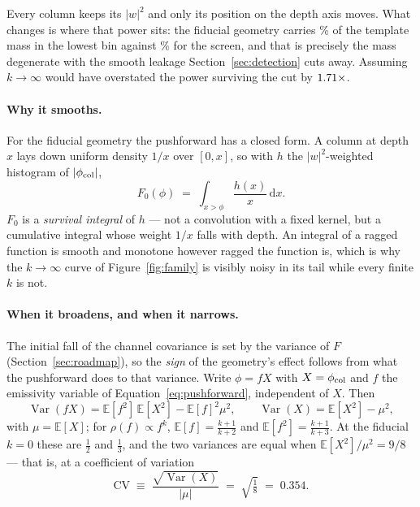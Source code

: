 \documentclass[11pt]{article}
\begin{document}
Every column keeps its $|w|^2$ and only its position on the depth axis
moves. What changes is where that power sits: the fiducial geometry
carries \MassZeroBinFid\% of the template mass in the lowest bin
against \MassZeroBinInf\% for the screen, and that is precisely the
mass degenerate with the smooth leakage Section~\ref{sec:detection}
cuts away. Assuming $k\to\infty$ would have overstated the power
surviving the cut by $1.71\times$.

\paragraph{Why it smooths.} For the fiducial geometry the pushforward
has a closed form. A column at depth $x$ lays down uniform density
$1/x$ over $[0,x]$, so with $h$ the $|w|^2$-weighted histogram of
$|\phi_{\rm col}|$,
\begin{equation}
  F_0(\phi) \;=\; \int_{x>\phi} \frac{h(x)}{x}\,\mathrm dx .
  \label{eq:survival}
\end{equation}
$F_0$ is a \emph{survival integral} of $h$ --- not a convolution with a
fixed kernel, but a cumulative integral whose weight $1/x$ falls with
depth. An integral of a ragged function is smooth and monotone however
ragged the function is, which is why the $k\to\infty$ curve of
Figure~\ref{fig:family} is visibly noisy in its tail while every finite
$k$ is not.

\paragraph{When it broadens, and when it narrows.} The initial fall of
the channel covariance is set by the variance of $F$
(Section~\ref{sec:roadmap}), so the \emph{sign} of the geometry's
effect follows from what the pushforward does to that variance. Write
$\phi = fX$ with $X = \phi_{\rm col}$ and $f$ the emissivity variable
of Equation~\eqref{eq:pushforward}, independent of $X$. Then
\begin{equation}
  \operatorname{Var}(fX) =
  \mathbb{E}[f^2]\,\mathbb{E}[X^2] - \mathbb{E}[f]^2\mu^2,
  \qquad
  \operatorname{Var}(X) = \mathbb{E}[X^2] - \mu^2,
  \label{eq:pushvar}
\end{equation}
with $\mu = \mathbb{E}[X]$; for $\rho(f)\propto f^k$,
$\mathbb{E}[f] = \tfrac{k+1}{k+2}$ and
$\mathbb{E}[f^2] = \tfrac{k+1}{k+3}$. At the fiducial $k=0$ these are
$\tfrac12$ and $\tfrac13$, and the two variances are equal when
$\mathbb{E}[X^2]/\mu^2 = 9/8$ --- that is, at a coefficient of
variation
\begin{equation}
  \mathrm{CV} \;\equiv\; \frac{\sqrt{\operatorname{Var}(X)}}{|\mu|}
  \;=\; \sqrt{\tfrac18} \;=\; 0.354 .
  \label{eq:cvcrit}
\end{equation}
\end{document}

